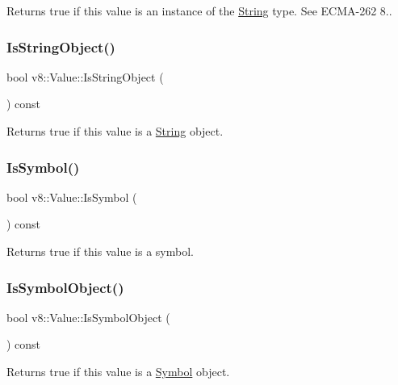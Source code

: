 Returns true if this value is an instance of the \mbox{\hyperlink{classv8_1_1String}{String}} type. See E\+C\+M\+A-\/262 8.. \mbox{\label{classv8_1_1Value_a32054145eadf3b1a3f900dcd52110e2b}} 
\subsubsection{\texorpdfstring{Is\+String\+Object()}{IsStringObject()}}
{\footnotesize\ttfamily bool v8\+::\+Value\+::\+Is\+String\+Object (\begin{DoxyParamCaption}{ }\end{DoxyParamCaption}) const}

Returns true if this value is a \mbox{\hyperlink{classv8_1_1String}{String}} object. \mbox{\label{classv8_1_1Value_a0fee90dc2589b156d277a74b0b225a71}} 
\subsubsection{\texorpdfstring{Is\+Symbol()}{IsSymbol()}}
{\footnotesize\ttfamily bool v8\+::\+Value\+::\+Is\+Symbol (\begin{DoxyParamCaption}{ }\end{DoxyParamCaption}) const}

Returns true if this value is a symbol. \mbox{\label{classv8_1_1Value_a1d5507f09734f8062a0d0a9a78496b2a}} 
\subsubsection{\texorpdfstring{Is\+Symbol\+Object()}{IsSymbolObject()}}
{\footnotesize\ttfamily bool v8\+::\+Value\+::\+Is\+Symbol\+Object (\begin{DoxyParamCaption}{ }\end{DoxyParamCaption}) const}

Returns true if this value is a \mbox{\hyperlink{classv8_1_1Symbol}{Symbol}} object. \mbox{\label{classv8_1_1Value_a48c300598bad0155eb59965c9e6b86b6}} 
